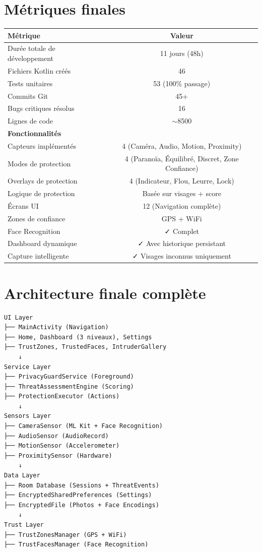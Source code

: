 \documentclass[11pt,a4paper]{article}
\begin{document}
\section{Métriques finales}

\begin{center}
\begin{tabular}{lc}
\toprule
\textbf{Métrique} & \textbf{Valeur}\\
\midrule
Durée totale de développement & 11 jours (48h)\\
Fichiers Kotlin créés & 46\\
Tests unitaires & 53 (100\% passage)\\
Commits Git & 45+\\
Bugs critiques résolus & 16\\
Lignes de code & $\sim$8500\\
\midrule
\textbf{Fonctionnalités} & \\
Capteurs implémentés & 4 (Caméra, Audio, Motion, Proximity)\\
Modes de protection & 4 (Paranoïa, Équilibré, Discret, Zone Confiance)\\
Overlays de protection & 4 (Indicateur, Flou, Leurre, Lock)\\
Logique de protection & Basée sur visages + score\\
Écrans UI & 12 (Navigation complète)\\
Zones de confiance & GPS + WiFi\\
Face Recognition & ✓ Complet\\
Dashboard dynamique & ✓ Avec historique persistant\\
Capture intelligente & ✓ Visages inconnus uniquement\\
\bottomrule
\end{tabular}
\end{center}

\section{Architecture finale complète}

\begin{verbatim}
UI Layer
├── MainActivity (Navigation)
├── Home, Dashboard (3 niveaux), Settings
├── TrustZones, TrustedFaces, IntruderGallery
    ↓
Service Layer
├── PrivacyGuardService (Foreground)
├── ThreatAssessmentEngine (Scoring)
├── ProtectionExecutor (Actions)
    ↓
Sensors Layer
├── CameraSensor (ML Kit + Face Recognition)
├── AudioSensor (AudioRecord)
├── MotionSensor (Accelerometer)
├── ProximitySensor (Hardware)
    ↓
Data Layer
├── Room Database (Sessions + ThreatEvents)
├── EncryptedSharedPreferences (Settings)
├── EncryptedFile (Photos + Face Encodings)
    ↓
Trust Layer
├── TrustZonesManager (GPS + WiFi)
├── TrustFacesManager (Face Recognition)
\end{verbatim}
\end{document}
